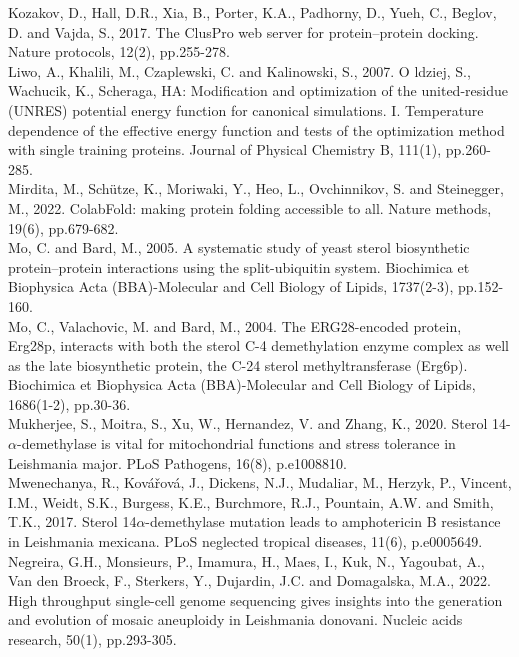 \documentclass{bioinfo}
\begin{document}
Kozakov, D., Hall, D.R., Xia, B., Porter, K.A., Padhorny, D., Yueh, C.,
Beglov, D. and Vajda, S., 2017. The ClusPro web server for
protein--protein docking. Nature protocols, 12(2), pp.255-278.\\

Liwo, A., Khalili, M., Czaplewski, C. and Kalinowski, S., 2007. O
ldziej, S., Wachucik, K., Scheraga, HA: Modification and optimization of
the united-residue (UNRES) potential energy function for canonical
simulations. I. Temperature dependence of the effective energy function
and tests of the optimization method with single training proteins.
Journal of Physical Chemistry B, 111(1), pp.260-285.\\

Mirdita, M., Schütze, K., Moriwaki, Y., Heo, L., Ovchinnikov, S. and
Steinegger, M., 2022. ColabFold: making protein folding accessible to
all. Nature methods, 19(6), pp.679-682.\\

Mo, C. and Bard, M., 2005. A systematic study of yeast sterol
biosynthetic protein--protein interactions using the split-ubiquitin
system. Biochimica et Biophysica Acta (BBA)-Molecular and Cell Biology
of Lipids, 1737(2-3), pp.152-160.\\

Mo, C., Valachovic, M. and Bard, M., 2004. The ERG28-encoded protein,
Erg28p, interacts with both the sterol C-4 demethylation enzyme complex
as well as the late biosynthetic protein, the C-24 sterol
methyltransferase (Erg6p). Biochimica et Biophysica Acta (BBA)-Molecular
and Cell Biology of Lipids, 1686(1-2), pp.30-36.\\

Mukherjee, S., Moitra, S., Xu, W., Hernandez, V. and Zhang, K., 2020.
Sterol 14-\(\alpha\)-demethylase is vital for mitochondrial functions
and stress tolerance in Leishmania major. PLoS Pathogens, 16(8),
p.e1008810.\\

Mwenechanya, R., Kovářová, J., Dickens, N.J., Mudaliar, M., Herzyk, P.,
Vincent, I.M., Weidt, S.K., Burgess, K.E., Burchmore, R.J., Pountain,
A.W. and Smith, T.K., 2017. Sterol 14\(\alpha\)-demethylase mutation
leads to amphotericin B resistance in Leishmania mexicana. PLoS
neglected tropical diseases, 11(6), p.e0005649.\\

Negreira, G.H., Monsieurs, P., Imamura, H., Maes, I., Kuk, N., Yagoubat,
A., Van den Broeck, F., Sterkers, Y., Dujardin, J.C. and Domagalska,
M.A., 2022. High throughput single-cell genome sequencing gives insights
into the generation and evolution of mosaic aneuploidy in Leishmania
donovani. Nucleic acids research, 50(1), pp.293-305.\\
\end{document}
